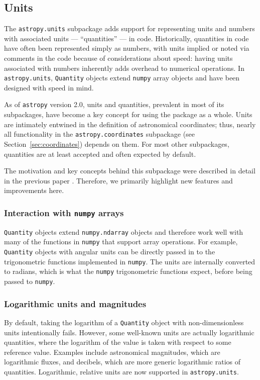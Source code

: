\documentclass[modern]{aastex62}
\newcommand{\package}[1]{\texttt{#1}\xspace}
\newcommand{\astropypkg}{\package{astropy}}
\newcommand{\sectionname}{Section\xspace}
\begin{document}
\subsection{Units}\label{sec:units}

The \texttt{astropy.units} subpackage adds support for representing units and
numbers with associated units --- ``quantities'' --- in code.
Historically, quantities in code have often been represented simply as numbers,
with units implied or noted via comments in the code because of considerations
about speed: having units associated with numbers inherently adds overhead to
numerical operations.
In \texttt{astropy.units}, \texttt{Quantity} objects extend \texttt{numpy}
array objects and have been designed with speed in mind.

As of \astropypkg version 2.0, units and quantities, prevalent in most of its
subpackages, have become a key concept for using the package as a whole.
Units are intimately entwined in the definition of astronomical coordinates;
thus, nearly all functionality in the \texttt{astropy.coordinates} subpackage
(see \sectionname~\ref{sec:coordinates}) depends on them.
For most other subpackages, quantities are at least accepted and often expected
by default.

The motivation and key concepts behind this subpackage were described in detail
in the previous paper \citep{astropy}. Therefore, we primarily highlight new
features and improvements here.

\subsubsection{Interaction with \package{numpy} arrays}

\texttt{Quantity} objects extend
\texttt{numpy.ndarray} objects and therefore
work well with many of the functions in \texttt{numpy} that support
array operations. For example, \texttt{Quantity} objects with angular
units can be directly passed in to the trigonometric functions implemented in
\texttt{numpy}. The units are internally converted to radians, which is what
the \texttt{numpy} trigonometric functions expect, before being passed to
\texttt{numpy}.

\subsubsection{Logarithmic units and magnitudes}
        By default, taking the logarithm of
        a \texttt{Quantity} object with non-dimensionless units intentionally
        fails.
        However, some well-known units are actually logarithmic quantities,
        where the logarithm of the value is taken with respect to some reference
        value.
        Examples include astronomical magnitudes, which are logarithmic fluxes,
        and decibels, which are more generic logarithmic ratios of quantities.
        Logarithmic, relative units are now supported in \texttt{astropy.units}.
\end{document}
